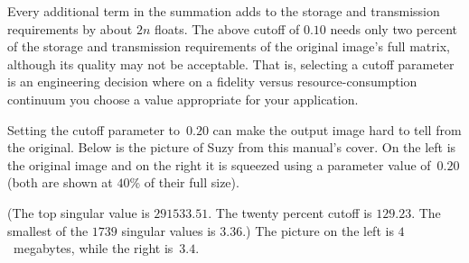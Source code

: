 Every additional term in the summation
adds to the storage and transmission requirements by about $2n$ floats.
The above cutoff of $0.10$ needs 
only two percent of the storage
and transmission requirements of the original image's full matrix,
although its quality may not be acceptable.
That is, selecting a cutoff parameter is an engineering decision where
on a fidelity versus resource-consumption continuum 
you choose a value appropriate for your application.
 
Setting
the cutoff parameter to~$0.20$ can make the output image hard to tell
from the original.
Below is the picture of Suzy 
from this manual's cover.
On the left is the original image
and on the right it is squeezed using a parameter value of~$0.20$
(both are shown at $40$\% of their full size).
\begin{center}
  \quad
\end{center}
(The top singular value is 
$291533.51$.
The twenty percent cutoff is $129.23$. 
The smallest of the $1739$ singular values is $3.36$.)
The picture on the left is $4$~megabytes, 
while the right is~$3.4$.


